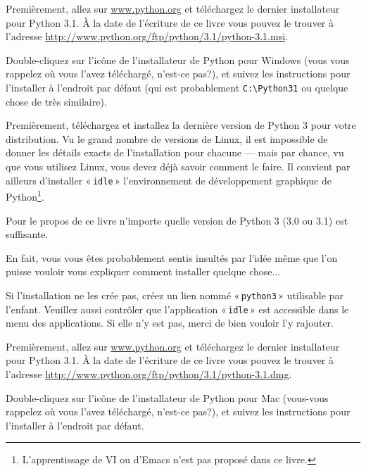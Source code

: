 \begin{WINDOWS}
Premièrement, allez sur \url{www.python.org} et téléchargez le dernier installateur pour Python 3.1. À la date de l'écriture de ce livre vous pouvez le trouver à l'adresse  \url{http://www.python.org/ftp/python/3.1/python-3.1.msi}.

Double-cliquez sur l'icône de l'installateur de Python pour Windows (vous vous rappelez où vous l'avez téléchargé, n'est-ce pas?), et suivez les instructions pour l'installer à l'endroit par défaut (qui est probablement \verb+C:\Python31+ ou quelque chose de très similaire).
\end{WINDOWS}

\begin{LINUX}
Premièrement, téléchargez et installez la dernière version de Python 3 pour votre distribution. Vu le grand nombre de versions de Linux, il est impossible de donner les détails exacts de l'installation pour chacune --- mais par chance, vu que vous utilisez Linux, vous devez déjà savoir comment le faire. Il convient par ailleurs d'installer « \texttt{idle} » l'environnement de développement graphique de Python\footnote{L'apprentissage de VI ou d'Emacs n'est pas proposé dans ce livre.}.  

Pour le propos de ce livre n'importe quelle version de Python 3 (3.0 ou 3.1) est suffisante. 

En fait, vous vous êtes probablement sentis insultés par l'idée même que l'on puisse vouloir vous expliquer comment installer quelque chose...

Si l'installation ne les crée pas, créez un lien nommé « \texttt{python3} » utilisable par l'enfant. Veuillez aussi contrôler que l'application « \texttt{idle} » est accessible dans le menu des applications. Si elle n'y est pas, merci de bien vouloir l'y rajouter.
\end{LINUX}

\begin{MAC}
Premièrement, allez sur \url{www.python.org} et téléchargez le dernier installateur pour Python 3.1. À la date de l'écriture de ce livre vous pouvez le trouver à l'adresse  \url{http://www.python.org/ftp/python/3.1/python-3.1.dmg}.

Double-cliquez sur l'icône de l'installateur de Python pour Mac (vous-vous rappelez où vous l'avez téléchargé, n'est-ce pas?), et suivez les instructions pour l'installer à l'endroit par défaut.
\end{MAC}
  
